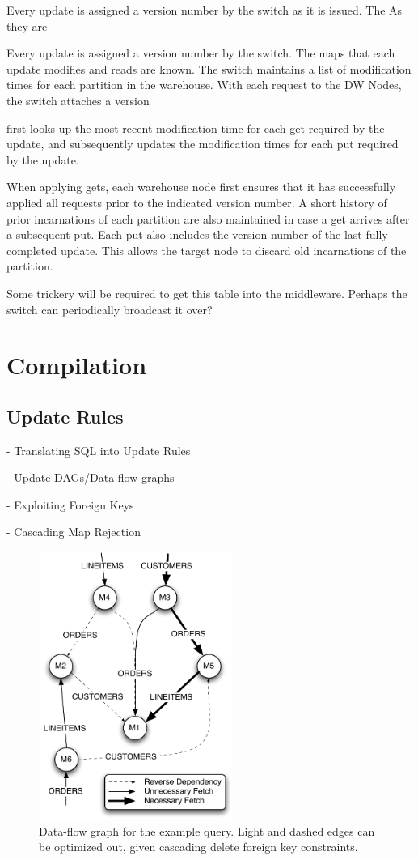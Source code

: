 \documentclass{sig-alternate}
\begin{document}
Every update is assigned a version number by the switch as it is issued.  The 
As they are 

Every update is assigned a version number by the switch.  The maps that each update modifies and reads are known.  The switch maintains a list of modification times for each partition in the warehouse.  With each request to the DW Nodes, the switch attaches a version 

 first looks up the most recent modification time for each get required by the update, and subsequently updates the modification times for each put required by the update.  

When applying gets, each warehouse node first ensures that it has successfully applied all requests prior to the indicated version number.  A short history of prior incarnations of each partition are also maintained in case a get arrives after a subsequent put.  Each put also includes the version number of the last fully completed update.  This allows the target node to discard old incarnations of the partition.

Some trickery will be required to get this table into the middleware.  Perhaps the switch can periodically broadcast it over?

\section{Compilation}
\label{sec:compilation}

\subsection{Update Rules}
- Translating SQL into Update Rules

- Update DAGs/Data flow graphs

- Exploiting Foreign Keys

- Cascading Map Rejection

\begin{figure}
\begin{center}
\includegraphics[width=2.5in]{images/q12_graph.pdf}
\caption{Data-flow graph for the example query.  Light and dashed edges can be optimized out, given cascading delete foreign key constraints.}
\label{fig:dataflow}
\end{center}
\end{figure}
\end{document}

